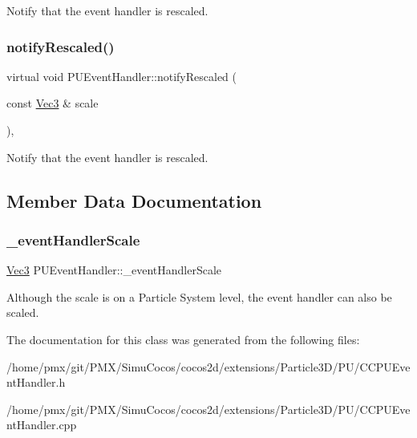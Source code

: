 Notify that the event handler is rescaled. \mbox{\label{classPUEventHandler_a3bd376b30698822a875d2c2c9b19075f}} 
\subsubsection{\texorpdfstring{notify\+Rescaled()}{notifyRescaled()}\hspace{0.1cm}{\footnotesize\ttfamily [2/2]}}
{\footnotesize\ttfamily virtual void P\+U\+Event\+Handler\+::notify\+Rescaled (\begin{DoxyParamCaption}\item[{const \hyperlink{classVec3}{Vec3} \&}]{scale }\end{DoxyParamCaption})\hspace{0.3cm}{\ttfamily [inline]}, {\ttfamily [virtual]}}

Notify that the event handler is rescaled. 

\subsection{Member Data Documentation}
\mbox{\label{classPUEventHandler_ae9ddbef4454b744877ca025c78d45969}} 
\subsubsection{\texorpdfstring{\+\_\+event\+Handler\+Scale}{\_eventHandlerScale}}
{\footnotesize\ttfamily \hyperlink{classVec3}{Vec3} P\+U\+Event\+Handler\+::\+\_\+event\+Handler\+Scale\hspace{0.3cm}{\ttfamily [protected]}}

Although the scale is on a Particle System level, the event handler can also be scaled. 

The documentation for this class was generated from the following files\+:\begin{DoxyCompactItemize}
\item 
/home/pmx/git/\+P\+M\+X/\+Simu\+Cocos/cocos2d/extensions/\+Particle3\+D/\+P\+U/C\+C\+P\+U\+Event\+Handler.\+h\item 
/home/pmx/git/\+P\+M\+X/\+Simu\+Cocos/cocos2d/extensions/\+Particle3\+D/\+P\+U/C\+C\+P\+U\+Event\+Handler.\+cpp\end{DoxyCompactItemize}
